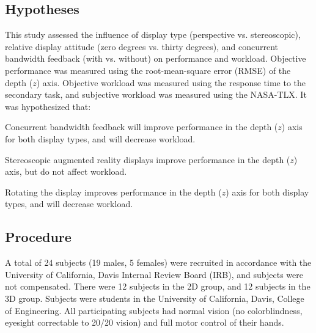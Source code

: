 \subsection{Hypotheses}
This study assessed the influence of display type (perspective vs. stereoscopic), relative display attitude (zero degrees vs. thirty degrees), and concurrent bandwidth feedback (with vs. without) on performance and workload.
Objective performance was measured using the root-mean-square error (RMSE) of the depth ($z$) axis.
Objective workload was measured using the response time to the secondary task, and subjective workload was measured using the NASA-TLX.
It was hypothesized that:
\begin{description}[align=left]
    \item [Hypothesis 1] Concurrent bandwidth feedback will improve performance in the depth ($z$) axis for both display types, and will decrease workload.
    \item [Hypothesis 2] Stereoscopic augmented reality displays improve performance in the depth ($z$) axis, but do not affect workload.
    \item [Hypothesis 3] Rotating the display improves performance in the depth ($z$) axis for both display types, and will decrease workload.
\end{description}

\subsection{Procedure}
A total of 24 subjects (19 males, 5 females) were recruited in accordance with the University of California, Davis Internal Review Board (IRB), and subjects were not compensated.
There were 12 subjects in the 2D group, and 12 subjects in the 3D group.
Subjects were students in the University of California, Davis, College of Engineering.
All participating subjects had normal vision (no colorblindness, eyesight correctable to 20/20 vision) and full motor control of their hands.

